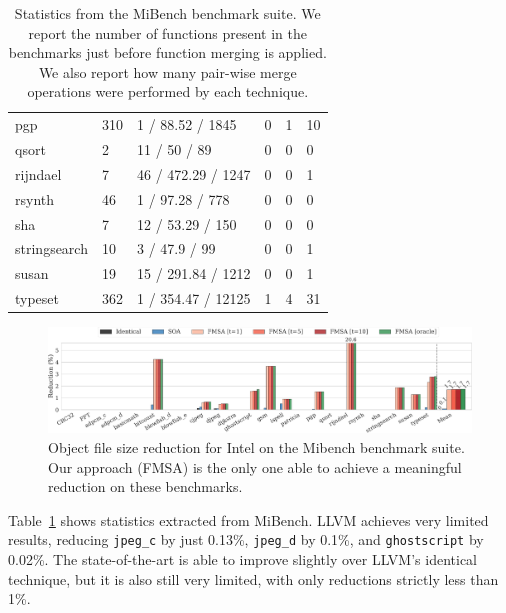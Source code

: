 \begin{table}[h]
{\begin{tabular}{llllll}
\rowcolor{evencolor} pgp           & 310   & 1 / 88.52 / 1845     & 0     & 1   & 10   \\
                     qsort         & 2     & 11 / 50 / 89         & 0     & 0   & 0    \\
\rowcolor{evencolor} rijndael      & 7     & 46 / 472.29 / 1247   & 0     & 0   & 1    \\
                     rsynth        & 46    & 1 / 97.28 / 778      & 0     & 0   & 0    \\
\rowcolor{evencolor} sha           & 7     & 12 / 53.29 / 150     & 0     & 0   & 0    \\
                     stringsearch  & 10    & 3 / 47.9 / 99        & 0     & 0   & 1    \\
\rowcolor{evencolor} susan         & 19    & 15 / 291.84 / 1212   & 0     & 0   & 1    \\
                     typeset       & 362   & 1 / 354.47 / 12125   & 1     & 4   & 31   \\
\bottomrule
\end{tabular}
}
\caption{
Statistics from the MiBench benchmark suite.
We report the number of functions present in the benchmarks just before function merging is applied. We also report how many pair-wise merge operations were performed by
each technique.
}
\label{tab:stats-mibench}
\end{table}


\begin{figure}[t]
  \centering
  \includegraphics[width=\linewidth]{figs/code-size-reduction-mibench.pdf}
  \caption{Object file size reduction for Intel on the Mibench benchmark suite.
   Our approach (FMSA) is the only one able to achieve a meaningful reduction on these benchmarks.}
  \label{fig:code-size-reduction-mibench}
\end{figure}

Table~\ref{tab:stats-mibench} shows statistics extracted from MiBench.
LLVM achieves very limited results, reducing \texttt{jpeg\_c} by just 0.13\%,
\texttt{jpeg\_d} by 0.1\%, and \texttt{ghostscript} by 0.02\%.
The state-of-the-art is able to improve slightly over LLVM's identical technique,
but it is also still very limited, with only reductions strictly less than 1\%.


